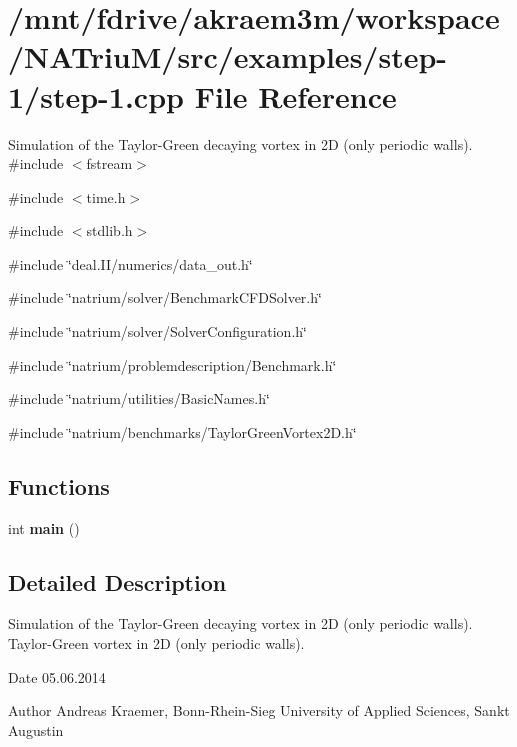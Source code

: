 \hypertarget{step-1_8cpp}{
\section{/mnt/fdrive/akraem3m/workspace/NATriuM/src/examples/step-\/1/step-\/1.cpp File Reference}
\label{step-1_8cpp}
}


Simulation of the Taylor-\/Green decaying vortex in 2D (only periodic walls).  
{\ttfamily \#include $<$fstream$>$}\par
{\ttfamily \#include $<$time.h$>$}\par
{\ttfamily \#include $<$stdlib.h$>$}\par
{\ttfamily \#include \char`\"{}deal.II/numerics/data\_\-out.h\char`\"{}}\par
{\ttfamily \#include \char`\"{}natrium/solver/BenchmarkCFDSolver.h\char`\"{}}\par
{\ttfamily \#include \char`\"{}natrium/solver/SolverConfiguration.h\char`\"{}}\par
{\ttfamily \#include \char`\"{}natrium/problemdescription/Benchmark.h\char`\"{}}\par
{\ttfamily \#include \char`\"{}natrium/utilities/BasicNames.h\char`\"{}}\par
{\ttfamily \#include \char`\"{}natrium/benchmarks/TaylorGreenVortex2D.h\char`\"{}}\par
\subsection*{Functions}
\begin{DoxyCompactItemize}
\item 
\hypertarget{step-1_8cpp_ae66f6b31b5ad750f1fe042a706a4e3d4}{
int {\bfseries main} ()}
\label{step-1_8cpp_ae66f6b31b5ad750f1fe042a706a4e3d4}

\end{DoxyCompactItemize}


\subsection{Detailed Description}
Simulation of the Taylor-\/Green decaying vortex in 2D (only periodic walls). Taylor-\/Green vortex in 2D (only periodic walls).

\begin{DoxyDate}{Date}
05.06.2014 
\end{DoxyDate}
\begin{DoxyAuthor}{Author}
Andreas Kraemer, Bonn-\/Rhein-\/Sieg University of Applied Sciences, Sankt Augustin 
\end{DoxyAuthor}

